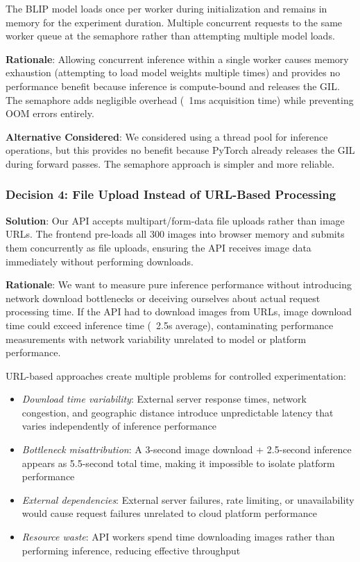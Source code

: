 The BLIP model loads once per worker during initialization and remains in memory for the experiment duration. Multiple concurrent requests to the same worker queue at the semaphore rather than attempting multiple model loads.

\textbf{Rationale}: Allowing concurrent inference within a single worker causes memory exhaustion (attempting to load model weights multiple times) and provides no performance benefit because inference is compute-bound and releases the GIL. The semaphore adds negligible overhead (~1ms acquisition time) while preventing OOM errors entirely.

\textbf{Alternative Considered}: We considered using a thread pool for inference operations, but this provides no benefit because PyTorch already releases the GIL during forward passes. The semaphore approach is simpler and more reliable.

\subsubsection{Decision 4: File Upload Instead of URL-Based Processing}

\textbf{Solution}: Our API accepts multipart/form-data file uploads rather than image URLs. The frontend pre-loads all 300 images into browser memory and submits them concurrently as file uploads, ensuring the API receives image data immediately without performing downloads.

\textbf{Rationale}: We want to measure pure inference performance without introducing network download bottlenecks or deceiving ourselves about actual request processing time. If the API had to download images from URLs, image download time could exceed inference time (~2.5s average), contaminating performance measurements with network variability unrelated to model or platform performance.

URL-based approaches create multiple problems for controlled experimentation:
\begin{itemize}
\item \textit{Download time variability}: External server response times, network congestion, and geographic distance introduce unpredictable latency that varies independently of inference performance
\item \textit{Bottleneck misattribution}: A 3-second image download + 2.5-second inference appears as 5.5-second total time, making it impossible to isolate platform performance
\item \textit{External dependencies}: External server failures, rate limiting, or unavailability would cause request failures unrelated to cloud platform performance
\item \textit{Resource waste}: API workers spend time downloading images rather than performing inference, reducing effective throughput
\end{itemize}

